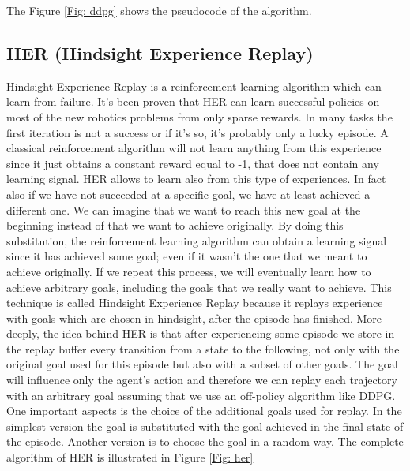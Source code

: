 \documentclass[a4paper]{report}
\begin{document}
The Figure \ref{Fig: ddpg} shows the pseudocode of the algorithm.



\subsection{HER (Hindsight Experience Replay)}
Hindsight Experience Replay is a reinforcement learning algorithm which can learn from failure. It's been proven that HER can learn successful policies on most of the new robotics problems from only sparse rewards. In many tasks the first iteration is not a success or if it's so, it's probably only a lucky episode. A classical reinforcement algorithm will not learn anything from this experience since it just obtains a constant reward equal to -1, that does not contain any learning signal. HER allows to learn also from this type of experiences. In fact also if we have not succeeded at a specific goal, we have at least achieved a different one. We can imagine that we want to reach this new goal at the beginning instead of that we want to achieve originally. By doing this substitution, the reinforcement learning algorithm can obtain a learning signal since it has achieved some goal; even if it wasn't the one that we meant to achieve originally. If we repeat this process, we will eventually learn how to achieve arbitrary goals, including the goals that we really want to achieve. This technique is called Hindsight Experience Replay because it replays experience with goals which are chosen in hindsight, after the episode has finished. More deeply, the idea behind HER is that after experiencing some episode we store in the replay buffer every transition from a state to the following, not only with the original goal used for this episode but also with a subset of other goals. The goal will influence only the agent's action and therefore we can replay each trajectory with an arbitrary goal assuming that we use an off-policy algorithm like DDPG. One important aspects is the choice of the additional goals used for replay. In the simplest version the goal is substituted with the goal achieved in the final state of the episode. Another version is to choose the goal in a random way. The complete algorithm of HER is illustrated in Figure \ref{Fig: her}
\end{document}
